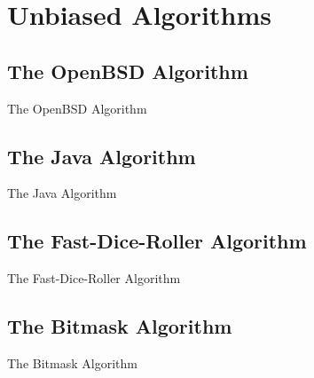 \section{Unbiased Algorithms}

\subsection{The OpenBSD Algorithm}
\begin{frame}{The OpenBSD Algorithm}
    \pause 
    

\end{frame}



\subsection{The Java Algorithm}
\begin{frame}{The Java Algorithm}
    \pause 
    

\end{frame}



\subsection{The Fast-Dice-Roller Algorithm}
\begin{frame}{The Fast-Dice-Roller Algorithm}
    \pause 
    

\end{frame}



\subsection{The Bitmask Algorithm}
\begin{frame}{The Bitmask Algorithm}
    \pause 
    

\end{frame}